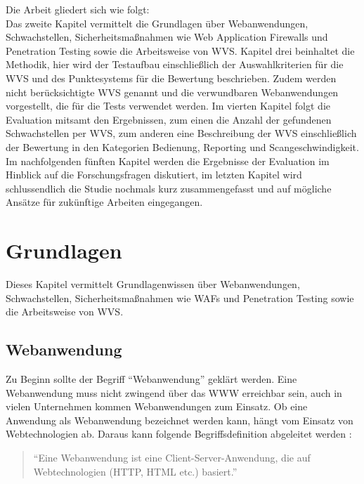 \documentclass[12pt,oneside,a4paper,parskip,pointlessnumbers]{scrbook}
\begin{document}
Die Arbeit gliedert sich wie folgt:\\
Das zweite Kapitel vermittelt die Grundlagen über Webanwendungen, Schwachstellen,  Sicherheitsmaßnahmen wie Web Application Firewalls und Penetration Testing sowie die Arbeitsweise von WVS. Kapitel drei beinhaltet die Methodik, hier wird der Testaufbau einschließlich der Auswahlkriterien für die WVS und des Punktesystems für die Bewertung beschrieben. Zudem werden nicht berücksichtigte WVS genannt und die verwundbaren Webanwendungen vorgestellt, die für die Tests verwendet werden. Im vierten Kapitel folgt die Evaluation mitsamt den Ergebnissen, zum einen die Anzahl der gefundenen Schwachstellen per WVS, zum anderen eine Beschreibung der WVS einschließlich der Bewertung in den Kategorien Bedienung, Reporting und Scangeschwindigkeit. Im nachfolgenden fünften Kapitel werden die Ergebnisse der Evaluation im Hinblick auf die Forschungsfragen diskutiert, im letzten Kapitel wird schlussendlich die Studie nochmals kurz zusammengefasst und auf mögliche Ansätze für zukünftige Arbeiten eingegangen.

\chapter{Grundlagen}
Dieses Kapitel vermittelt Grundlagenwissen über Webanwendungen, Schwachstellen, Sicherheitsmaßnahmen wie \acp{WAF} und Penetration Testing sowie die Arbeitsweise von WVS.
  \section{Webanwendung}
  Zu Beginn sollte der Begriff ``Webanwendung'' geklärt werden.
  Eine Webanwendung muss nicht zwingend über das \ac{WWW} erreichbar sein, auch in vielen Unternehmen kommen Webanwendungen zum Einsatz. Ob eine Anwendung als Webanwendung bezeichnet werden kann, hängt vom Einsatz von Webtechnologien ab. Daraus kann folgende Begriffsdefinition abgeleitet werden \cite[S.1]{Rohr}:

  \begin{quote}``Eine Webanwendung ist eine Client-Server-Anwendung, die auf Webtechnologien (HTTP, HTML etc.) basiert.''\end{quote}
\end{document}

